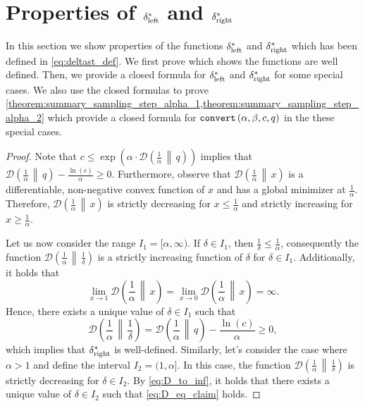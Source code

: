 \documentclass[letterpaper,11pt]{article}
\newcommand{\1}[1]{\mathds{1}\left[#1\right]}
\newcommand{\runtime}[1][\alpha, \beta, c, q]{\textnormal{\texttt{convert}}\left(#1\right)}
\newcommand{\D}[2]{\mathcal{D}\left(#1\, \middle\|\,#2 \right)}
\newcommand{\sdeltal}{\delta^{*}_{\textnormal{left}}}
\newcommand{\sdeltar}{\delta^{*}_{\textnormal{right}}}
\begin{document}
 



 
\section{Properties of  $\sdeltal$ and $\sdeltar$}
\label{sec:sdelta_expl_formula}


In this section we show properties of the functions $\sdeltal$ and $\sdeltar$ which has been defined in \eqref{eq:deltast_def}.  We first prove  which shows the functions are well defined. Then, we provide a closed formula for $\sdeltal$ and $\sdeltar$ for some special cases. 
We also use the   closed formulas   to prove 
 \cref{theorem:summary_sampling_step_alpha_1,theorem:summary_sampling_step_alpha_2} which provide a closed formula for $\runtime$ in the these special cases.  


\sdeltawelldefined*
\begin{proof}
	Note that $c\leq \exp\left(\alpha\cdot \D{\frac{1}{\alpha}}{q}\right)$ implies that $\D{\frac{1}{\alpha}}{q} - \frac{\ln(c)}{\alpha} \geq 0$.
	Furthermore, observe that $\D{\frac{1}{\alpha}}{x}$ is a differentiable, non-negative convex function of $x$
	and has a global minimizer at $\frac{1}{\alpha}$.
	Therefore, $\D{\frac{1}{\alpha}}{x}$ is strictly decreasing for $x \leq \frac{1}{\alpha}$
	and strictly increasing for $x \geq \frac{1}{\alpha}$.
	
	Let us now consider the range $I_1 = [\alpha, \infty)$.
	If $\delta \in I_1$, then $\frac{1}{\delta} \leq \frac{1}{\alpha}$,
	consequently the function $\D{\frac{1}{\alpha}}{\frac{1}{\delta}}$ is a strictly
	increasing function of $\delta$ for $\delta \in I_1$.
	Additionally, it holds that
	\begin{equation}\label{eq:D_to_inf}
		\lim_{x \to 1} \D{\frac{1}{\alpha}}{x} = \lim_{x \to 0} \D{\frac{1}{\alpha}}{x} = \infty.
	\end{equation}
	Hence, there exists a unique value of $\delta \in I_1$ such that
	\begin{equation}\label{eq:D_eq_claim}
		\D{\frac{1}{\alpha}}{\frac{1}{\delta}} = \D{\frac{1}{\alpha}}{q} - \frac{\ln(c)}{\alpha} \geq 0,
	\end{equation}
	which implies that $\sdeltar$ is well-defined.
	Similarly, let's consider the case where $\alpha > 1$ and define the interval $I_2=(1,\alpha]$.
	In this case, the function $\D{\frac{1}{\alpha}}{\frac{1}{\delta}}$ is strictly
	decreasing for $\delta \in I_2$.
	By \eqref{eq:D_to_inf}, it holds that there exists a unique value of $\delta \in I_2$
	such that \cref{eq:D_eq_claim} holds.
\end{proof}
\end{document}
